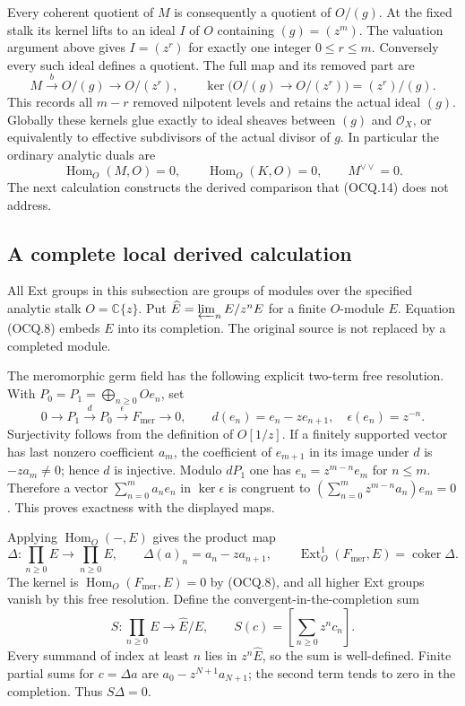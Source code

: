 Every coherent quotient of $M$ is consequently a quotient of $O/(g)$.
At the fixed stalk its kernel lifts to an ideal $I$ of $O$ containing
$(g)=(z^m)$.  The valuation argument above gives $I=(z^r)$ for exactly
one integer $0\le r\le m$.  Conversely every such ideal defines a
quotient.  The full map and its removed part are
\[
 M\xrightarrow b O/(g)\longrightarrow O/(z^r),\qquad
 \ker\bigl(O/(g)\to O/(z^r)\bigr)=(z^r)/(g).                  \tag{OCQ.13}
\]
This records all $m-r$ removed nilpotent levels and retains the actual
ideal $(g)$.  Globally these kernels glue exactly to ideal sheaves
between $(g)$ and $\mathcal O_X$, or equivalently to effective
subdivisors of the actual divisor of $g$.
In particular the ordinary analytic duals are
\[
 \operatorname{Hom}_O(M,O)=0,\qquad
 \operatorname{Hom}_O(K,O)=0,\qquad M^{\vee\vee}=0.            \tag{OCQ.14}
\]
The next calculation constructs the derived comparison that (OCQ.14)
does not address.

\subsection{A complete local derived calculation}

All Ext groups in this subsection are groups of modules over the specified
analytic stalk $O=\mathbb C\{z\}$.  Put
$\widehat E=\varprojlim_nE/z^nE$ for a finite $O$-module $E$.
Equation (OCQ.8) embeds $E$ into its completion.
The original source is not replaced by a completed module.

The meromorphic germ field has the following explicit two-term free
resolution.  With $P_0=P_1=\bigoplus_{n\ge0}Oe_n$, set
\[
 0\longrightarrow P_1\xrightarrow d P_0
   \xrightarrow\epsilon F_{\mathrm{mer}}\longrightarrow0,
 \qquad d(e_n)=e_n-ze_{n+1},\quad\epsilon(e_n)=z^{-n}.          \tag{OCQ.15}
\]
Surjectivity follows from the definition of $O[1/z]$.
If a finitely supported vector has last nonzero coefficient $a_m$,
the coefficient of $e_{m+1}$ in its image under $d$ is $-za_m\ne0$;
hence $d$ is injective.  Modulo $dP_1$ one has
$e_n=z^{m-n}e_m$ for $n\le m$.  Therefore a vector
$\sum_{n=0}^m a_ne_n$ in $\ker\epsilon$ is congruent to
$(\sum_{n=0}^m z^{m-n}a_n)e_m=0$.  This proves exactness with the
displayed maps.

Applying $\operatorname{Hom}_O(-,E)$ gives the product map
\[
 \Delta:\prod_{n\ge0}E\longrightarrow\prod_{n\ge0}E,
 \qquad\Delta(a)_n=a_n-za_{n+1},\qquad
 \operatorname{Ext}^1_O(F_{\mathrm{mer}},E)=\operatorname{coker}\Delta.
                                                               \tag{OCQ.16}
\]
The kernel is $\operatorname{Hom}_O(F_{\mathrm{mer}},E)=0$ by
(OCQ.8), and all higher Ext groups vanish by this free resolution.
Define the convergent-in-the-completion sum
\[
 S:\prod_{n\ge0}E\longrightarrow\widehat E/E,
       \qquad S(c)=\left[\sum_{n\ge0}z^nc_n\right].           \tag{OCQ.17}
\]
Every summand of index at least $n$ lies in $z^n\widehat E$, so the
sum is well-defined.  Finite partial sums for $c=\Delta a$ are
$a_0-z^{N+1}a_{N+1}$; the second term tends to zero in the completion.
Thus $S\Delta=0$.

